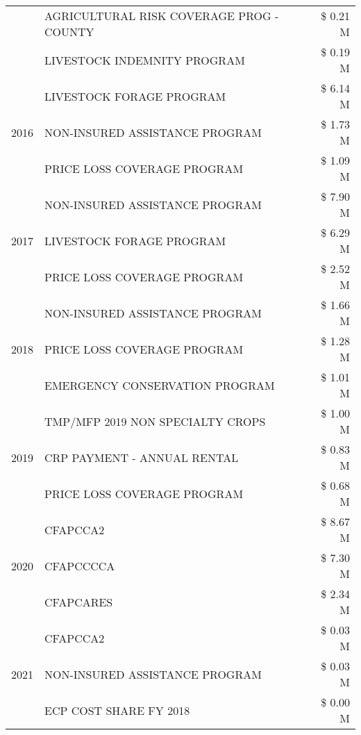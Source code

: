 \begin{tabular}{llr}
 & AGRICULTURAL RISK COVERAGE PROG - COUNTY & \$ 0.21 M \\
 & LIVESTOCK INDEMNITY PROGRAM & \$ 0.19 M \\
\cline{1-3}
\multirow[t]{3}{*}{2016} & LIVESTOCK FORAGE PROGRAM & \$ 6.14 M \\
 & NON-INSURED ASSISTANCE PROGRAM & \$ 1.73 M \\
 & PRICE LOSS COVERAGE PROGRAM & \$ 1.09 M \\
\cline{1-3}
\multirow[t]{3}{*}{2017} & NON-INSURED ASSISTANCE PROGRAM & \$ 7.90 M \\
 & LIVESTOCK FORAGE PROGRAM & \$ 6.29 M \\
 & PRICE LOSS COVERAGE PROGRAM & \$ 2.52 M \\
\cline{1-3}
\multirow[t]{3}{*}{2018} & NON-INSURED ASSISTANCE PROGRAM & \$ 1.66 M \\
 & PRICE LOSS COVERAGE PROGRAM & \$ 1.28 M \\
 & EMERGENCY CONSERVATION PROGRAM & \$ 1.01 M \\
\cline{1-3}
\multirow[t]{3}{*}{2019} & TMP/MFP 2019 NON SPECIALTY CROPS & \$ 1.00 M \\
 & CRP PAYMENT - ANNUAL RENTAL & \$ 0.83 M \\
 & PRICE LOSS COVERAGE PROGRAM & \$ 0.68 M \\
\cline{1-3}
\multirow[t]{3}{*}{2020} & CFAPCCA2 & \$ 8.67 M \\
 & CFAPCCCCA & \$ 7.30 M \\
 & CFAPCARES & \$ 2.34 M \\
\cline{1-3}
\multirow[t]{3}{*}{2021} & CFAPCCA2 & \$ 0.03 M \\
 & NON-INSURED ASSISTANCE PROGRAM & \$ 0.03 M \\
 & ECP COST SHARE FY 2018 & \$ 0.00 M \\
\cline{1-3}
\bottomrule
\end{tabular}

